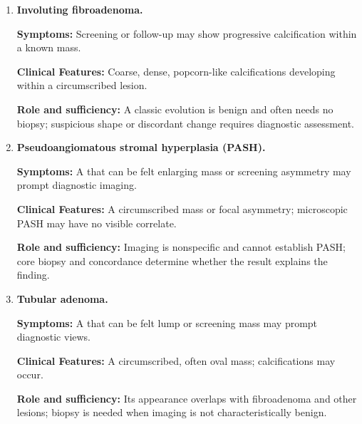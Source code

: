 \begin{enumerate}[leftmargin=*,itemsep=0.45em,topsep=0.4em]
\item \textbf{Involuting fibroadenoma.}\par\noindent\textbf{Symptoms:} Screening or follow-up may show progressive calcification within a known mass.\par\noindent\textbf{Clinical Features:} Coarse, dense, popcorn-like calcifications developing within a circumscribed lesion.\par\noindent\textbf{Role and sufficiency:} A classic evolution is benign and often needs no biopsy; suspicious shape or discordant change requires diagnostic assessment.
\item \textbf{Pseudoangiomatous stromal hyperplasia (PASH).}\par\noindent\textbf{Symptoms:} A that can be felt enlarging mass or screening asymmetry may prompt diagnostic imaging.\par\noindent\textbf{Clinical Features:} A circumscribed mass or focal asymmetry; microscopic PASH may have no visible correlate.\par\noindent\textbf{Role and sufficiency:} Imaging is nonspecific and cannot establish PASH; core biopsy and concordance determine whether the result explains the finding.
\item \textbf{Tubular adenoma.}\par\noindent\textbf{Symptoms:} A that can be felt lump or screening mass may prompt diagnostic views.\par\noindent\textbf{Clinical Features:} A circumscribed, often oval mass; calcifications may occur.\par\noindent\textbf{Role and sufficiency:} Its appearance overlaps with fibroadenoma and other lesions; biopsy is needed when imaging is not characteristically benign.
\end{enumerate}

